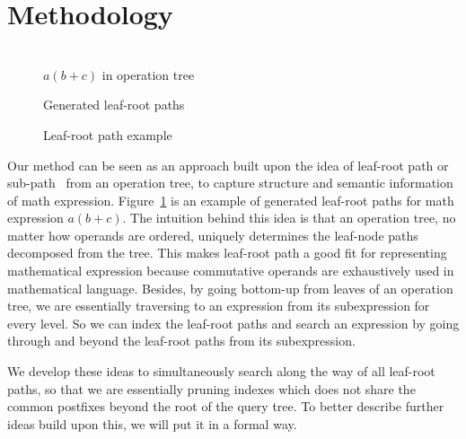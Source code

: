 \documentclass{acm_proc_article-sp}
\begin{document}
\section{Methodology}
\begin{figure}
\begin{minipage}[b]{1.60in}
\begin{center}
\\$a(b+c)$ in operation tree
\end{center}
\end{minipage}
\hspace*{0in}
\begin{minipage}[b]{1.60in}
\begin{center}
Generated leaf-root paths
\end{center}
\end{minipage}
\caption{Leaf-root path example}\label{oprtreeExample}
\end{figure}
Our method can be seen as an approach built upon the idea of leaf-root path or sub-path~\cite{signifjap,MathMLleafroot,signfused,sefobyfo} from an operation tree, to capture structure and semantic information of math expression. 
Figure~\ref{oprtreeExample} is an example of generated leaf-root paths for math expression $a(b+c)$.
The intuition behind this idea is that an operation tree, no matter how operands are ordered, uniquely determines the leaf-node paths decomposed from the tree.
This makes leaf-root path a good fit for representing mathematical expression because commutative operands are exhaustively used in mathematical language.
Besides, by going bottom-up from leaves of an operation tree, we are essentially traversing to an expression from its subexpression for every level. 
So we can index the leaf-root paths and search an expression by going through and beyond the leaf-root paths from its subexpression.

We develop these ideas to simultaneously search along the way of all leaf-root paths, so that we are essentially pruning indexes which does not share the common postfixes beyond the root of the query tree.
To better describe further ideas build upon this, we will put it in a formal way.
\end{document}
